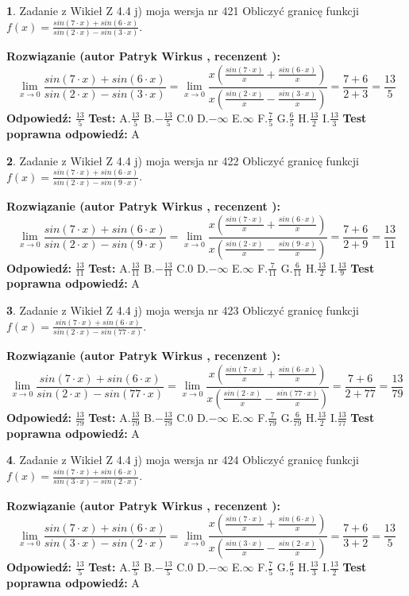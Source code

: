 \documentclass[12pt, a4paper]{article}
\theoremstyle{definition} %
\newtheorem{zad}{}
\newcommand{\zadStart}[1]{\begin{zad}#1\newline}
\newcommand{\zadStop}{\end{zad}}
\newcommand{\rozwStart}[2]{\noindent \textbf{Rozwiązanie (autor #1 , recenzent #2): }\newline}
\newcommand{\rozwStop}{\newline}
\newcommand{\odpStart}{\noindent \textbf{Odpowiedź:}\newline}
\newcommand{\odpStop}{\newline}
\newcommand{\testStart}{\noindent \textbf{Test:}\newline}
\newcommand{\testStop}{\newline}
\newcommand{\kluczStart}{\noindent \textbf{Test poprawna odpowiedź:}\newline}
\newcommand{\kluczStop}{\newline}
\begin{document}
\zadStart{Zadanie z Wikieł Z 4.4 j) moja wersja nr 421}
Obliczyć granicę funkcji $f(x)=\frac{sin(7\cdot x) +sin(6\cdot x)}{sin(2\cdot x) -sin(3\cdot x)}$.
\zadStop
\rozwStart{Patryk Wirkus}{}
$$\lim\limits_{x\to 0}\frac{sin(7\cdot x) +sin(6\cdot x)}{sin(2\cdot x) -sin(3\cdot x)}=\lim\limits_{x\to 0}\frac{x(\frac{sin(7\cdot x)}{x}+\frac{sin(6\cdot x)}{x})}{x(\frac{sin(2\cdot x)}{x}-\frac{sin(3\cdot x)}{x})}=\frac{7+6}{2+3} = \frac{13}{5}$$
\rozwStop
\odpStart
$\frac{13}{5}$
\odpStop
\testStart
A.$\frac{13}{5}$
B.$-\frac{13}{5}$
C.$0$
D.$-\infty$
E.$\infty$
F.$\frac{7}{5}$
G.$\frac{6}{5}$
H.$\frac{13}{2}$
I.$\frac{13}{3}$
\testStop
\kluczStart
A
\kluczStop



\zadStart{Zadanie z Wikieł Z 4.4 j) moja wersja nr 422}
Obliczyć granicę funkcji $f(x)=\frac{sin(7\cdot x) +sin(6\cdot x)}{sin(2\cdot x) -sin(9\cdot x)}$.
\zadStop
\rozwStart{Patryk Wirkus}{}
$$\lim\limits_{x\to 0}\frac{sin(7\cdot x) +sin(6\cdot x)}{sin(2\cdot x) -sin(9\cdot x)}=\lim\limits_{x\to 0}\frac{x(\frac{sin(7\cdot x)}{x}+\frac{sin(6\cdot x)}{x})}{x(\frac{sin(2\cdot x)}{x}-\frac{sin(9\cdot x)}{x})}=\frac{7+6}{2+9} = \frac{13}{11}$$
\rozwStop
\odpStart
$\frac{13}{11}$
\odpStop
\testStart
A.$\frac{13}{11}$
B.$-\frac{13}{11}$
C.$0$
D.$-\infty$
E.$\infty$
F.$\frac{7}{11}$
G.$\frac{6}{11}$
H.$\frac{13}{2}$
I.$\frac{13}{9}$
\testStop
\kluczStart
A
\kluczStop



\zadStart{Zadanie z Wikieł Z 4.4 j) moja wersja nr 423}
Obliczyć granicę funkcji $f(x)=\frac{sin(7\cdot x) +sin(6\cdot x)}{sin(2\cdot x) -sin(77\cdot x)}$.
\zadStop
\rozwStart{Patryk Wirkus}{}
$$\lim\limits_{x\to 0}\frac{sin(7\cdot x) +sin(6\cdot x)}{sin(2\cdot x) -sin(77\cdot x)}=\lim\limits_{x\to 0}\frac{x(\frac{sin(7\cdot x)}{x}+\frac{sin(6\cdot x)}{x})}{x(\frac{sin(2\cdot x)}{x}-\frac{sin(77\cdot x)}{x})}=\frac{7+6}{2+77} = \frac{13}{79}$$
\rozwStop
\odpStart
$\frac{13}{79}$
\odpStop
\testStart
A.$\frac{13}{79}$
B.$-\frac{13}{79}$
C.$0$
D.$-\infty$
E.$\infty$
F.$\frac{7}{79}$
G.$\frac{6}{79}$
H.$\frac{13}{2}$
I.$\frac{13}{77}$
\testStop
\kluczStart
A
\kluczStop



\zadStart{Zadanie z Wikieł Z 4.4 j) moja wersja nr 424}
Obliczyć granicę funkcji $f(x)=\frac{sin(7\cdot x) +sin(6\cdot x)}{sin(3\cdot x) -sin(2\cdot x)}$.
\zadStop
\rozwStart{Patryk Wirkus}{}
$$\lim\limits_{x\to 0}\frac{sin(7\cdot x) +sin(6\cdot x)}{sin(3\cdot x) -sin(2\cdot x)}=\lim\limits_{x\to 0}\frac{x(\frac{sin(7\cdot x)}{x}+\frac{sin(6\cdot x)}{x})}{x(\frac{sin(3\cdot x)}{x}-\frac{sin(2\cdot x)}{x})}=\frac{7+6}{3+2} = \frac{13}{5}$$
\rozwStop
\odpStart
$\frac{13}{5}$
\odpStop
\testStart
A.$\frac{13}{5}$
B.$-\frac{13}{5}$
C.$0$
D.$-\infty$
E.$\infty$
F.$\frac{7}{5}$
G.$\frac{6}{5}$
H.$\frac{13}{3}$
I.$\frac{13}{2}$
\testStop
\kluczStart
A
\kluczStop
\end{document}
